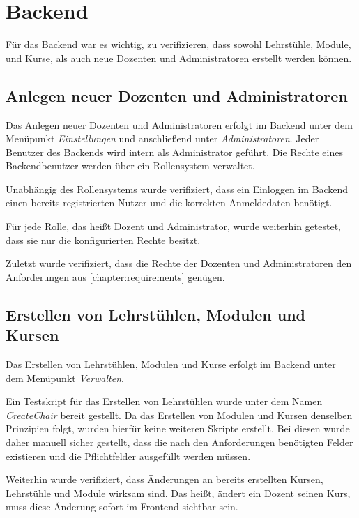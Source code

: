 	\section{Backend}
	
		Für das Backend war es wichtig, zu verifizieren, dass sowohl Lehrstühle, Module, und Kurse, als auch neue Dozenten und Administratoren erstellt werden können.
			
		\subsection{Anlegen neuer Dozenten und Administratoren}
		
			Das Anlegen neuer Dozenten und Administratoren erfolgt im Backend unter dem Menüpunkt \textit{Einstellungen} und anschließend unter \textit{Administratoren}.
			Jeder Benutzer des Backends wird intern als Administrator geführt.
			Die Rechte eines Backendbenutzer werden über ein Rollensystem verwaltet.
            
			Unabhängig des Rollensystems wurde verifiziert, dass ein Einloggen im Backend einen bereits registrierten Nutzer und die korrekten Anmeldedaten benötigt.
            
			Für jede Rolle, das heißt Dozent und Administrator, wurde weiterhin getestet, dass sie nur die konfigurierten Rechte besitzt.
            
			Zuletzt wurde verifiziert, dass die Rechte der Dozenten und Administratoren den Anforderungen aus \ref{chapter:requirements} genügen.
			
		\subsection{Erstellen von Lehrstühlen, Modulen und Kursen}
			
			Das Erstellen von Lehrstühlen, Modulen und Kurse erfolgt im Backend unter dem Menüpunkt \textit{Verwalten}.
            
			Ein Testskript für das Erstellen von Lehrstühlen wurde unter dem Namen \textit{CreateChair} bereit gestellt.
			Da das Erstellen von Modulen und Kursen denselben Prinzipien folgt, wurden hierfür keine weiteren Skripte erstellt.
			Bei diesen wurde daher manuell sicher gestellt, dass die nach den Anforderungen benötigten Felder existieren und die Pflichtfelder ausgefüllt werden müssen.
            
			Weiterhin wurde verifiziert, dass Änderungen an bereits erstellten Kursen, Lehrstühle und Module wirksam sind.
			Das heißt, ändert ein Dozent seinen Kurs, muss diese Änderung sofort im Frontend sichtbar sein.
	
